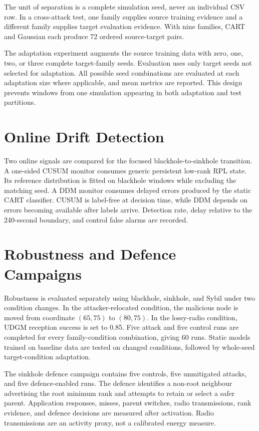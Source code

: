The unit of separation is a complete simulation seed, never an individual CSV row. In a cross-attack test, one family supplies source training evidence and a different family supplies target evaluation evidence. With nine families, CART and Gaussian each produce 72 ordered source-target pairs.

The adaptation experiment augments the source training data with zero, one, two, or three complete target-family seeds. Evaluation uses only target seeds not selected for adaptation. All possible seed combinations are evaluated at each adaptation size where applicable, and mean metrics are reported. This design prevents windows from one simulation appearing in both adaptation and test partitions.

\section{Online Drift Detection}

Two online signals are compared for the focused blackhole-to-sinkhole transition. A one-sided CUSUM monitor consumes generic persistent low-rank RPL state. Its reference distribution is fitted on blackhole windows while excluding the matching seed. A DDM monitor consumes delayed errors produced by the static CART classifier. CUSUM is label-free at decision time, while DDM depends on errors becoming available after labels arrive. Detection rate, delay relative to the 240-second boundary, and control false alarms are recorded.

\section{Robustness and Defence Campaigns}

Robustness is evaluated separately using blackhole, sinkhole, and Sybil under two condition changes. In the attacker-relocated condition, the malicious node is moved from coordinate $(65,75)$ to $(80,75)$. In the lossy-radio condition, UDGM reception success is set to 0.85. Five attack and five control runs are completed for every family-condition combination, giving 60 runs. Static models trained on baseline data are tested on changed conditions, followed by whole-seed target-condition adaptation.

The sinkhole defence campaign contains five controls, five unmitigated attacks, and five defence-enabled runs. The defence identifies a non-root neighbour advertising the root minimum rank and attempts to retain or select a safer parent. Application responses, misses, parent switches, radio transmissions, rank evidence, and defence decisions are measured after activation. Radio transmissions are an activity proxy, not a calibrated energy measure.

